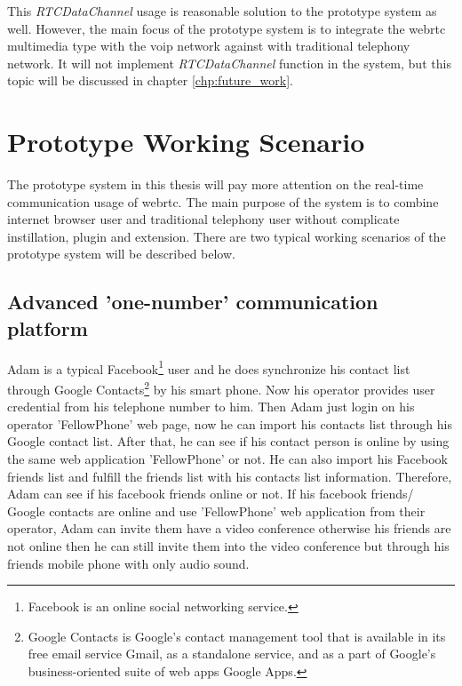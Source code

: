 \par This \textit{RTCDataChannel} usage is reasonable solution to the prototype system as well. However, the main focus of the prototype system is to integrate the \gls{webrtc} multimedia type with the \gls{voip} network against with traditional telephony network. It will not implement \textit{RTCDataChannel} function in the system, but this topic will be discussed in chapter \ref{chp:future_work}.

\section{Prototype Working Scenario}

\noindent The prototype system in this thesis will pay more attention on the real-time communication usage of \gls{webrtc}. The main purpose of the system is to combine internet browser user and traditional telephony user without complicate instillation, plugin and extension. There are two typical working scenarios of the prototype system will be described below.

\subsection{Advanced 'one-number' communication platform}

\par Adam is a typical Facebook\footnote{Facebook is an online social networking service.} user and he does synchronize his contact list through Google Contacts\footnote{Google Contacts is Google's contact management tool that is available in its free email service Gmail, as a standalone service, and as a part of Google's business-oriented suite of web apps Google Apps.\cite{wiki:google_contacts}} by his smart phone. Now his operator provides user credential from his telephone number to him. Then Adam just login on his operator 'FellowPhone' web page, now he can import his contacts list through his Google contact list. After that, he can see if his contact person is online by using the same web application 'FellowPhone' or not. He can also import his Facebook friends list and fulfill the friends list with his contacts list information. Therefore, Adam can see if his facebook friends online or not. If his facebook friends/ Google contacts are online and use 'FellowPhone' web application from their operator, Adam can invite them have a video conference otherwise his friends are not online then he can still invite them into the video conference but through his friends mobile phone with only audio sound.

